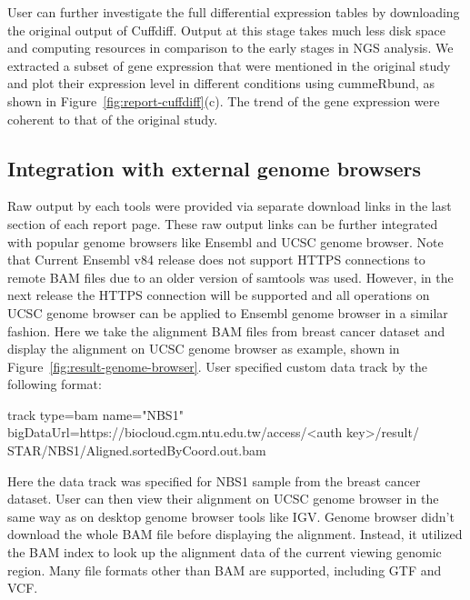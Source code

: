 User can further investigate the full differential expression tables by
downloading the original output of Cuffdiff. Output at this stage takes much
less disk space and computing resources in comparison to the early stages in
NGS analysis. We extracted a subset of gene expression that were mentioned in
the original study \cite{himes2014:rnaseq} and plot their expression level in
different conditions using cummeRbund, as shown in
Figure~\ref{fig:report-cuffdiff}(c). The trend of the gene expression were
coherent to that of the original study.



\subsection{Integration with external genome browsers}



Raw output by each tools were provided via separate download links in the last
section of each report page. These raw output links can be further integrated
with popular genome browsers like Ensembl and UCSC genome browser. Note that
Current Ensembl v84 release does not support HTTPS connections to remote BAM
files due to an older version of samtools was used. However, in the next
release the HTTPS connection will be supported and all operations on UCSC
genome browser can be applied to Ensembl genome browser in a similar fashion.
Here we take the alignment BAM files from breast cancer dataset and display the
alignment on UCSC genome browser as example, shown in
Figure~\ref{fig:result-genome-browser}. User specified custom data track by the
following format:

\begin{CVerbatim}[fontsize=\small]
track type=bam name="NBS1"
bigDataUrl=https://biocloud.cgm.ntu.edu.tw/access/<auth key>/result/
STAR/NBS1/Aligned.sortedByCoord.out.bam
\end{CVerbatim}

\vspace{-1em}\noindent
Here the data track was specified for NBS1 sample from the breast cancer
dataset. User can then view their alignment on UCSC genome browser in the same
way as on desktop genome browser tools like IGV. Genome browser didn't download
the whole BAM file before displaying the alignment. Instead, it utilized the
BAM index to look up the alignment data of the current viewing genomic region.
Many file formats other than BAM are supported, including GTF and VCF.



